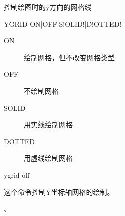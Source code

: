 \label{cmd:ygrid}

控制绘图时的y方向的网格线

\begin{SACSTX}
YGRID ON|OFF|S!OLID!|D!OTTED!
\end{SACSTX}

\begin{description}
\item [ON] 绘制网格，但不改变网格类型
\item [OFF] 不绘制网格
\item [SOLID] 用实线绘制网格
\item [DOTTED] 用虚线绘制网格
\end{description}

\begin{SACDFT}
ygrid off
\end{SACDFT}

这个命令控制Y坐标轴网格的绘制。

、

